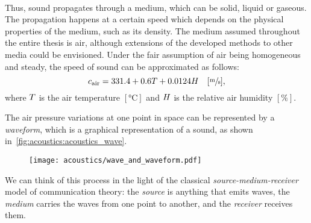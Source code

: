 \\Thus, sound propagates through a medium, which can be solid, liquid or gaseous.
The propagation happens at a certain speed which depends on the physical properties of the medium, such as its density.
The medium assumed throughout the entire thesis is air, although extensions of the developed methods to other media could be envisioned.
Under the fair assumption of air being homogeneous and steady, the speed of sound can be approximated as follows:
\begin{equation}
    c_\text{air} =  331.4 + 0.6T + 0.0124H \hspace{1em} [\sfrac{\si{\metre}}{\si{\second}}]
    ,
\end{equation}
where $T$ is the air temperature $[\si{\celsius}]$ and $H$ is the relative air humidity $[\%]$.

\mynewline
The air pressure variations at one point in space can be represented by a \textit{waveform}, which is a graphical representation of a sound, as shown in~\cref{fig:acoustics:acoustics_wave}.
\begin{figure}[h]
    \texttt{[image: acoustics/wave\_and\_waveform.pdf]}
\end{figure}

\mynewline
We can think of this process in the light of the classical \textit{source-medium-receiver} model of communication theory:
the \textit{source} is anything that emits waves, the \textit{medium} carries the waves from one point to another, and the \textit{receiver} receives them.


